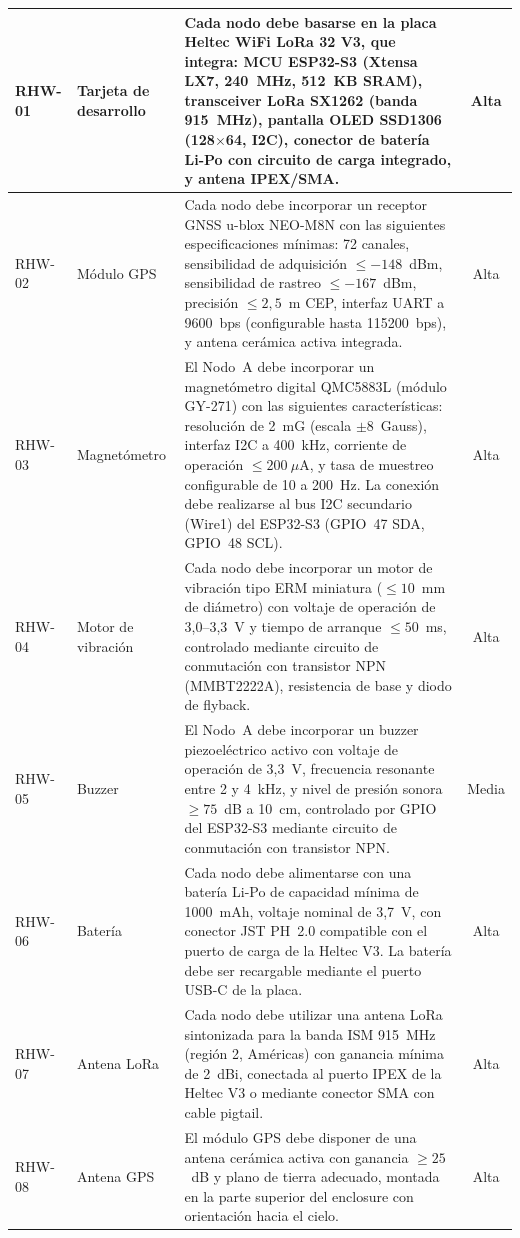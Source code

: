 \begin{table}[H]
\begin{center}
{\begin{tabular}{| l | l | p{8.5cm} | c |}
RHW-01 & Tarjeta de desarrollo & Cada nodo debe basarse en la placa Heltec WiFi LoRa 32 V3, que integra: MCU ESP32-S3 (Xtensa LX7, 240~MHz, 512~KB SRAM), transceiver LoRa SX1262 (banda 915~MHz), pantalla OLED SSD1306 (128$\times$64, I2C), conector de batería Li-Po con circuito de carga integrado, y antena IPEX/SMA. & Alta \\
\hline
RHW-02 & Módulo GPS & Cada nodo debe incorporar un receptor GNSS u-blox NEO-M8N con las siguientes especificaciones mínimas: 72 canales, sensibilidad de adquisición $\leq -148$~dBm, sensibilidad de rastreo $\leq -167$~dBm, precisión $\leq 2{,}5$~m CEP, interfaz UART a 9600~bps (configurable hasta 115200~bps), y antena cerámica activa integrada. & Alta \\
\hline
RHW-03 & Magnetómetro & El Nodo~A debe incorporar un magnetómetro digital QMC5883L (módulo GY-271) con las siguientes características: resolución de 2~mG (escala $\pm 8$~Gauss), interfaz I2C a 400~kHz, corriente de operación $\leq 200~\mu$A, y tasa de muestreo configurable de 10 a 200~Hz. La conexión debe realizarse al bus I2C secundario (Wire1) del ESP32-S3 (GPIO~47 SDA, GPIO~48 SCL). & Alta \\
\hline
RHW-04 & Motor de vibración & Cada nodo debe incorporar un motor de vibración tipo ERM miniatura ($\leq 10$~mm de diámetro) con voltaje de operación de 3,0--3,3~V y tiempo de arranque $\leq 50$~ms, controlado mediante circuito de conmutación con transistor NPN (MMBT2222A), resistencia de base y diodo de flyback. & Alta \\
\hline
RHW-05 & Buzzer & El Nodo~A debe incorporar un buzzer piezoeléctrico activo con voltaje de operación de 3,3~V, frecuencia resonante entre 2 y 4~kHz, y nivel de presión sonora $\geq 75$~dB a 10~cm, controlado por GPIO del ESP32-S3 mediante circuito de conmutación con transistor NPN. & Media \\
\hline
RHW-06 & Batería & Cada nodo debe alimentarse con una batería Li-Po de capacidad mínima de 1000~mAh, voltaje nominal de 3,7~V, con conector JST PH~2.0 compatible con el puerto de carga de la Heltec V3. La batería debe ser recargable mediante el puerto USB-C de la placa. & Alta \\
\hline
RHW-07 & Antena LoRa & Cada nodo debe utilizar una antena LoRa sintonizada para la banda ISM 915~MHz (región 2, Américas) con ganancia mínima de 2~dBi, conectada al puerto IPEX de la Heltec V3 o mediante conector SMA con cable pigtail. & Alta \\
\hline
RHW-08 & Antena GPS & El módulo GPS debe disponer de una antena cerámica activa con ganancia $\geq 25$~dB y plano de tierra adecuado, montada en la parte superior del enclosure con orientación hacia el cielo. & Alta \\

\end{tabular}}
\end{center}
\end{table}

